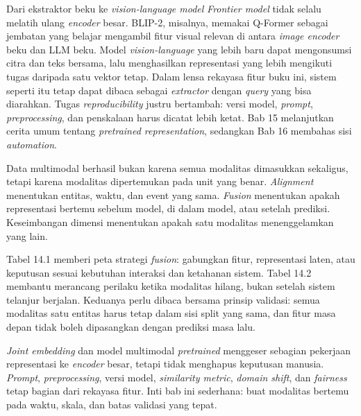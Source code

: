 \begin{pendalaman}{Dari ekstraktor beku ke \emph{vision-language model}}
\emph{Frontier model} tidak selalu melatih ulang \emph{encoder} besar. BLIP-2, misalnya, memakai Q-Former sebagai jembatan yang belajar mengambil fitur visual relevan di antara \emph{image encoder} beku dan LLM beku. Model \emph{vision-language} yang lebih baru dapat mengonsumsi citra dan teks bersama, lalu menghasilkan representasi yang lebih mengikuti tugas daripada satu vektor tetap. Dalam lensa rekayasa fitur buku ini, sistem seperti itu tetap dapat dibaca sebagai \emph{extractor} dengan \emph{query} yang bisa diarahkan. Tugas \emph{reproducibility} justru bertambah: versi model, \emph{prompt}, \emph{preprocessing}, dan penskalaan harus dicatat lebih ketat. Bab 15 melanjutkan cerita umum tentang \emph{pretrained representation}, sedangkan Bab 16 membahas sisi \emph{automation}.
\end{pendalaman}

\begin{sintesis}

Data multimodal berhasil bukan karena semua modalitas dimasukkan sekaligus, tetapi karena modalitas dipertemukan pada unit yang benar. \emph{Alignment} menentukan entitas, waktu, dan event yang sama. \emph{Fusion} menentukan apakah representasi bertemu sebelum model, di dalam model, atau setelah prediksi. Keseimbangan dimensi menentukan apakah satu modalitas menenggelamkan yang lain.

Tabel 14.1 memberi peta strategi \emph{fusion}: gabungkan fitur, representasi laten, atau keputusan sesuai kebutuhan interaksi dan ketahanan sistem. Tabel 14.2 membantu merancang perilaku ketika modalitas hilang, bukan setelah sistem telanjur berjalan. Keduanya perlu dibaca bersama prinsip validasi: semua modalitas satu entitas harus tetap dalam sisi split yang sama, dan fitur masa depan tidak boleh dipasangkan dengan prediksi masa lalu.

\emph{Joint embedding} dan model multimodal \emph{pretrained} menggeser sebagian pekerjaan representasi ke \emph{encoder} besar, tetapi tidak menghapus keputusan manusia. \emph{Prompt}, \emph{preprocessing}, versi model, \emph{similarity metric}, \emph{domain shift}, dan \emph{fairness} tetap bagian dari rekayasa fitur. Inti bab ini sederhana: buat modalitas bertemu pada waktu, skala, dan batas validasi yang tepat.

\end{sintesis}

